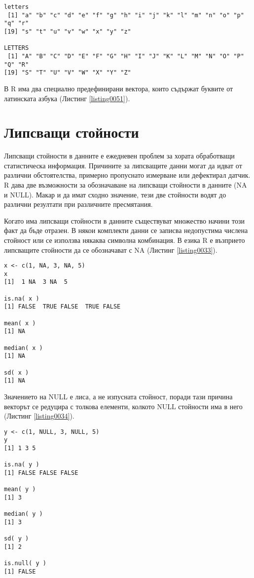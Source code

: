 \begin{lstlisting}[caption=Вектори с латинските букви, label=listing0051]
letters
 [1] "a" "b" "c" "d" "e" "f" "g" "h" "i" "j" "k" "l" "m" "n" "o" "p" "q" "r"
[19] "s" "t" "u" "v" "w" "x" "y" "z"

LETTERS
 [1] "A" "B" "C" "D" "E" "F" "G" "H" "I" "J" "K" "L" "M" "N" "O" "P" "Q" "R"
[19] "S" "T" "U" "V" "W" "X" "Y" "Z"
\end{lstlisting}

В R има два специално предефинирани вектора, които съдържат буквите от латинската азбука (Листинг \ref{listing0051}).

\section{Липсващи стойности}

Липсващи стойности в данните е ежедневен проблем за хората обработващи статистическа информация. Причините за липсващите данни могат да идват от различни обстоятелства, примерно пропуснато измерване или дефектирал датчик. R дава две възможности за обозначаване на липсващи стойности в данните (NA и NULL). Макар и да имат сходно значение, тези две стойности водят до различни резултати при различните пресмятания. 

Когато има липсващи стойности в данните съществуват множество начини този факт да бъде отразен. В някои комплекти данни се записва недопустима числена стойност или се използва някаква символна комбинация. В езика R е възприето липсващите стойности да се обозначават с NA (Листинг \ref{listing0033}).

\begin{lstlisting}[caption=Липсващи стойности, label=listing0033]
x <- c(1, NA, 3, NA, 5)
x
[1]  1 NA  3 NA  5

is.na( x )
[1] FALSE  TRUE FALSE  TRUE FALSE

mean( x )
[1] NA

median( x )
[1] NA

sd( x )
[1] NA
\end{lstlisting}

Значението на NULL е лиса, а не изпусната стойност, поради тази причина векторът се редуцира с толкова елементи, колкото NULL стойности има в него (Листинг \ref{listing0034}).

\begin{lstlisting}[caption=Липсващи стойности, label=listing0034]
y <- c(1, NULL, 3, NULL, 5)
y
[1] 1 3 5

is.na( y )
[1] FALSE FALSE FALSE

mean( y )
[1] 3

median( y )
[1] 3

sd( y )
[1] 2

is.null( y )
[1] FALSE
\end{lstlisting}


